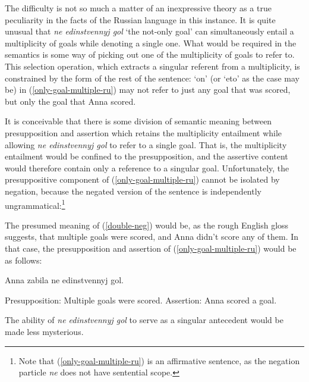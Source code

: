 \documentclass{article}
\begin{document}
The difficulty is not so much a matter of an inexpressive theory as a true peculiarity in the facts of the Russian language in this instance. It is quite unusual that \textit{ne edinstvennyj gol} `the not-only goal' can simultaneously entail a multiplicity of goals while denoting a single one. What would be required in the semantics is some way of picking out one of the multiplicity of goals to refer to. This selection operation, which extracts a singular referent from a multiplicity, is constrained by the form of the rest of the sentence: `on' (or `eto' as the case may be) in (\ref{only-goal-multiple-ru}) may not refer to just any goal that was scored, but only the goal that Anna scored.

It is conceivable that there is some division of semantic meaning between presupposition and assertion which retains the multiplicity entailment while allowing \textit{ne edinstvennyj gol} to refer to a single goal. That is, the multiplicity entailment would be confined to the presupposition, and the assertive content would therefore contain only a reference to a singular goal. Unfortunately, the presuppositive component of (\ref{only-goal-multiple-ru}) cannot be isolated by negation, because the negated version of the sentence is independently ungrammatical:\footnote{Note that (\ref{only-goal-multiple-ru}) is an affirmative sentence, as the negation particle \textit{ne} does not have sentential scope.}

\begin{exe}
\end{exe}

The presumed meaning of (\ref{double-neg}) would be, as the rough English gloss suggests, that multiple goals were scored, and Anna didn't score any of them. In that case, the presupposition and assertion of (\ref{only-goal-multiple-ru}) would be as follows:

\begin{exe}
	\ex Anna zabila ne edinstvennyj gol. \begin{xlist}
		\ex Presupposition: Multiple goals were scored.
		\ex Assertion: Anna scored a goal.
	\end{xlist}
\end{exe}

The ability of \textit{ne edinstvennyj gol} to serve as a singular antecedent would be made less mysterious. %
\end{document}
